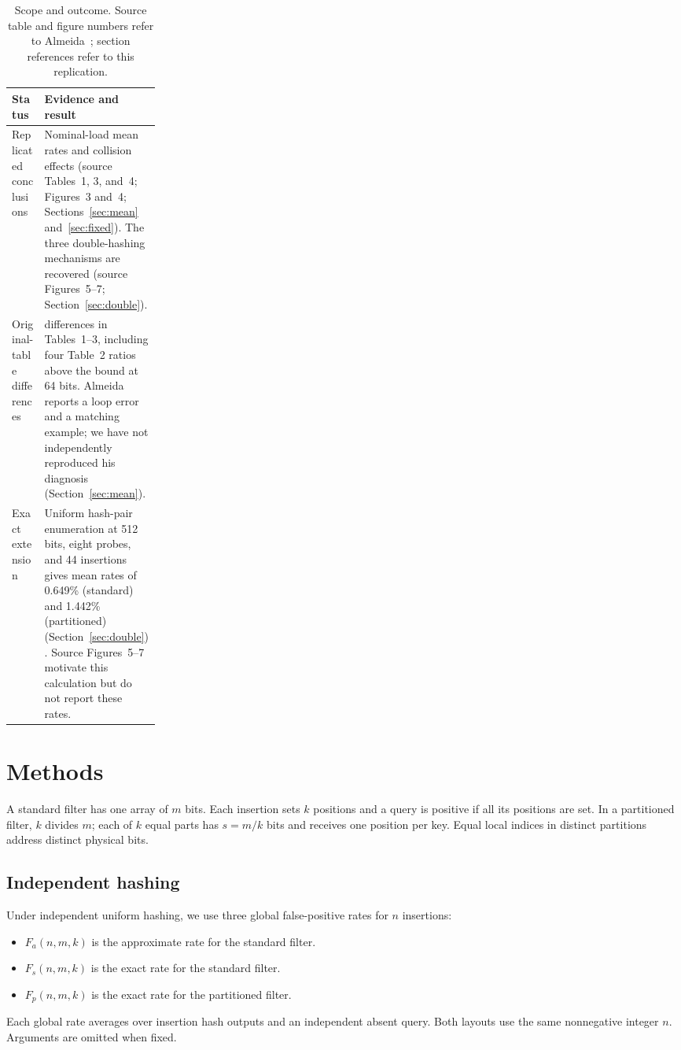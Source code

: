 \begin{table}[tbp]
\centering
\caption{Scope and outcome. Source table and figure numbers refer to
Almeida~\cite{almeida2023}; section references refer to this replication.}
\label{tab:scope}
\begin{tabularx}{\linewidth}{@{}>{\raggedright\arraybackslash}p{0.22\linewidth}>{\raggedright\arraybackslash}X@{}}
\toprule
Status & Evidence and result \\
\midrule
Replicated conclusions & Nominal-load mean rates and collision effects
(source Tables~1, 3, and~4; Figures~3 and~4; Sections~\ref{sec:mean}
and~\ref{sec:fixed}). The three double-hashing mechanisms are recovered
(source Figures~5--7; Section~\ref{sec:double}). \\
Original-table differences & 25 differences in Tables~1--3, including four
Table~2 ratios above the bound at 64 bits. Almeida reports a loop error and
a matching example; we have not independently reproduced his diagnosis
(Section~\ref{sec:mean}). \\
Exact extension & Uniform hash-pair enumeration at 512 bits, eight probes,
and 44 insertions gives mean rates of 0.649\% (standard) and 1.442\%
(partitioned) (Section~\ref{sec:double}). Source Figures~5--7 motivate
this calculation but do not report these rates. \\
\bottomrule
\end{tabularx}
\end{table}

\section{Methods}

A standard filter has one array of $m$ bits. Each insertion sets $k$
positions and a query is positive if all its positions are set. In a
partitioned filter, $k$ divides $m$; each of $k$ equal parts has $s=m/k$
bits and receives one position per key. Equal local indices in distinct
partitions address distinct physical bits.

\subsection{Independent hashing}

Under independent uniform hashing, we use three global false-positive rates
for $n$ insertions:
\begin{itemize}[noitemsep,topsep=2pt,leftmargin=*]
\item $F_a(n,m,k)$ is the approximate rate for the standard filter.
\item $F_s(n,m,k)$ is the exact rate for the standard filter.
\item $F_p(n,m,k)$ is the exact rate for the partitioned filter.
\end{itemize}
Each global rate averages over insertion hash outputs and an independent
absent query. Both layouts use the same nonnegative integer $n$.
Arguments are omitted when fixed.

